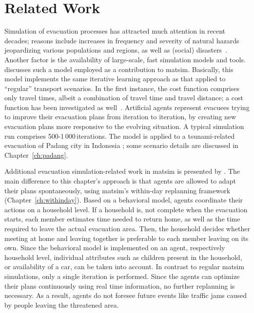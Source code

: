 \section{Related Work}
Simulation of evacuation processes has attracted much attention in recent decades; reasons include increases in frequency and severity of natural hazards jeopardizing various populations and regions, as well as (social) disasters~\citep{Rodr2006HBoDisasterResearch}. Another factor is the availability of large-scale, fast simulation models and tools. \citet{Laemmel_PhDThesis_2011} discusses such a model employed as a contribution to \gls{matsim}. Basically, this model implements the same iterative learning approach as that applied to ``regular'' transport scenarios. In the first instance, the cost function comprises only travel times, albeit a combination of travel time and travel distance; a cost function has been investigated as well~\citep{00LaemmelKluepfelNagel2009EvacPadangAtBookTimmermanns}. 
Artificial agents represent evacuees trying to improve their evacuation plans from iteration to iteration, by creating new evacuation plans more responsive to the evolving situation. 
A typical simulation run comprises 500-1\,000\,iterations. 
The model is applied to a tsunami-related evacuation of Padang city in Indonesia \citep[e.g.,][]{00TaubenboeckEtAl2012ConcludingLastMilePaperNatHazards,00GosebergEtAl2012LastLastMile}; some scenario details are discussed in Chapter~\ref{ch:padang}. 

Additional evacuation simulation-related work in \gls{matsim} is presented by \citet{Dobler_PhDThesis_2013}. The main difference to this chapter's approach is that agents are allowed to adapt their plans spontaneously, using \gls{matsim}'s within-day replanning framework \citep{DoblerEtAl_TRR_2012} (Chapter~\ref{ch:withinday}). 
Based on a behavioral model, agents coordinate their actions on a household level. If a household is, \eg not complete when the evacuation starts, each member estimates time needed to return home, as well as the time required to leave the actual evacuation area. Then, the household decides whether meeting at home and leaving together is preferable to each member leaving on its own.
Since the behavioral model is implemented on an agent, respectively household level, individual attributes such as children present in the household, or availability of a car, can be taken into account.
In contrast to regular \gls{matsim} simulations, only a single iteration is performed. Since the agents can optimize their plans continuously using real time information, no further replanning is necessary. As a result, agents do not foresee future events like traffic jams caused by people leaving the threatened area.

